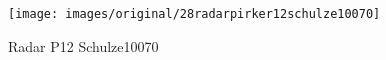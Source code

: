 \begin{figure}[!h] 
\centering 
\texttt{[image: images/original/28radarpirker12schulze10070]}
\caption{Radar P12 Schulze10070}
\label{fig:28radarpirker12schulze10070} 
\end{figure}

